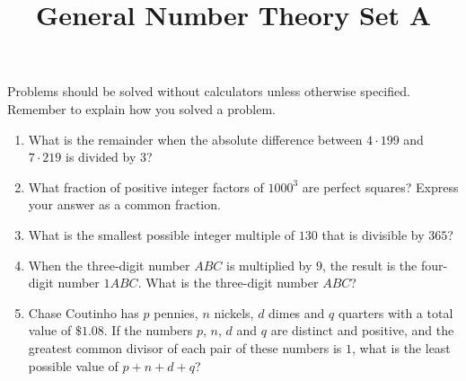 \documentclass{article}
\title{General Number Theory Set A}
\date{}
\author{}
\begin{document}
\maketitle
\begin{multicols}{2}
    \noindent Problems should be solved without calculators unless otherwise specified.
    Remember to explain how you solved a problem.
    \begin{enumerate}
        \item What is the remainder when the absolute difference between $4 \cdot 199$
        and $7 \cdot 219$ is divided by $3$?
            \vspace{3cm}
        \item What fraction of positive integer factors of $1000^3$ are perfect squares?
        Express your answer as a common fraction.
            \vspace{3cm}
        \item What is the smallest possible integer multiple of $130$ that is divisible by $365$?
            \vspace{3cm}
        \item When the three-digit number $ABC$ is multiplied by $9$, the result is the four-digit number $1ABC$.
        What is the three-digit number $ABC$?
            \vspace{3cm}
        \item Chase Coutinho has $p$ pennies, $n$ nickels, $d$ dimes and $q$ quarters with a total value of $\$1.08$.
        If the numbers $p$, $n$, $d$ and $q$ are distinct and positive,
        and the greatest common divisor of each pair of these numbers is $1$,
        what is the least possible value of $p + n + d + q$?
            \vspace{3cm}
    \end{enumerate}
\end{multicols}
\end{document}
